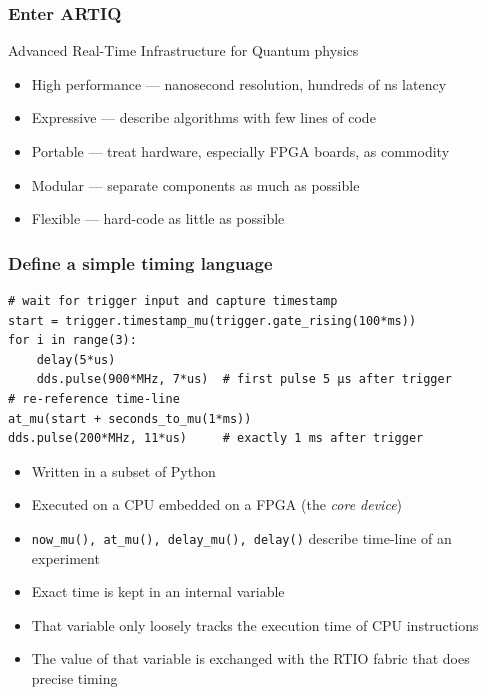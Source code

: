 \documentclass[final,presentation,compress]{beamer}
\begin{document}
\begin{frame}
  \frametitle{Enter ARTIQ}
  \alert{A}dvanced \alert{R}eal-\alert{T}ime \alert{I}nfrastructure for \alert{Q}uantum physics

  \footnotesize
  \begin{itemize}
    \item High performance --- nanosecond resolution, hundreds of ns latency
    \item Expressive --- describe algorithms with few lines of code
    \item Portable --- treat hardware, especially FPGA boards, as commodity
    \item Modular --- separate components as much as possible
    \item Flexible --- hard-code as little as possible
  \end{itemize}
\end{frame}

\begin{frame}[fragile]
  \frametitle{Define a simple timing language}
  \footnotesize

  \begin{verbatim}
# wait for trigger input and capture timestamp
start = trigger.timestamp_mu(trigger.gate_rising(100*ms))
for i in range(3):
    delay(5*us)
    dds.pulse(900*MHz, 7*us)  # first pulse 5 µs after trigger
# re-reference time-line
at_mu(start + seconds_to_mu(1*ms))
dds.pulse(200*MHz, 11*us)     # exactly 1 ms after trigger
  \end{verbatim}

  \begin{itemize}
    \item Written in a subset of Python
    \item Executed on a CPU embedded on a FPGA (the \emph{core device})
    \item \verb!now_mu(), at_mu(), delay_mu(), delay()! describe time-line of an experiment
    \item Exact time is kept in an internal variable
    \item That variable only loosely tracks the execution time of CPU instructions
    \item The value of that variable is exchanged with the RTIO fabric that
      does precise timing
  \end{itemize}
\end{frame}
\end{document}
